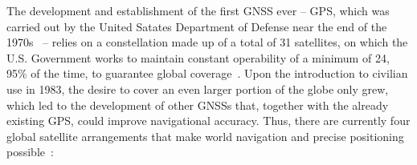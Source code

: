 The development and establishment of the first GNSS ever -- GPS, which was carried out by the United Satates Department of Defense near the end of the 1970s~\cite{novatel_gnss} -- relies on a constellation made up of a total of 31 satellites, on which the U.S. Government works to maintain constant operability of a minimum of 24, 95\% of the time, to guarantee global coverage~\cite{gps_USGov}.
Upon the introduction to civilian use in 1983, the desire to cover an even larger portion of the globe only grew, which led to the development of other GNSSs that, together with the already existing GPS, could improve navigational accuracy. Thus, there are currently four global satellite arrangements that make world navigation and precise positioning possible~\cite{novatel_gnss}:

\begingroup
